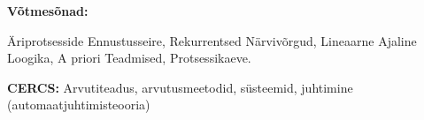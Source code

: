 \par
\vspace{4mm}
\noindent
\textbf{Võtmesõnad:} 
\par 
\noindent
Äriprotsesside Ennustusseire, Rekurrentsed Närvivõrgud, Lineaarne Ajaline Loogika, A priori Teadmised, Protsessikaeve.


\vspace{4mm}
\par
\noindent
\textbf{CERCS:} Arvutiteadus, arvutusmeetodid, süsteemid, juhtimine (automaatjuhtimisteooria)





